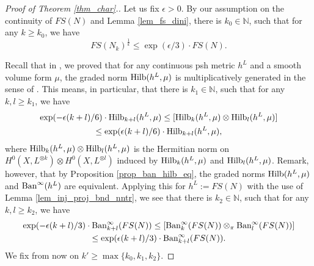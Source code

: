 \documentclass[12pt]{article}
\numberwithin{equation}{section}
\theoremstyle{theorem}
\theoremstyle{definition}
\theoremstyle{remark}
\newcommand{\nat}{\mathbb{N}}
\begin{document}
	\begin{proof}[Proof of Theorem \ref{thm_char}.]
		Let us fix $\epsilon > 0$.
		By our assumption on the continuity of $FS(N)$ and Lemma \ref{lem_fs_dini}, there is $k_0 \in \nat$, such that for any $k \geq k_0$, we have
		\begin{equation}\label{eq_fs_unif}
			FS(N_k)^{\frac{1}{k}}
			\leq
			\exp(\epsilon / 3) \cdot FS(N).
		\end{equation}
		\par 
		Recall that in \cite[Theorem 1.5]{FinSecRing}, we proved that for any continuous psh metric $h^L$ and a smooth volume form $\mu$, the graded norm ${\rm{Hilb}}(h^L, \mu)$ is multiplicatively generated in the sense of \cite[Definition 1.3]{FinSecRing}.
		This means, in particular, that there is $k_1 \in \nat$, such that for any $k, l \geq k_1$, we have
		\begin{multline}
			\exp(- \epsilon (k + l) / 6) \cdot {\rm{Hilb}}_{k + l}(h^L, \mu) \leq [{\rm{Hilb}}_k(h^L, \mu) \otimes {\rm{Hilb}}_l(h^L, \mu)] 
			\\
			\leq \exp(\epsilon (k + l) / 6) \cdot {\rm{Hilb}}_{k + l}(h^L, \mu),
		\end{multline}
		where ${\rm{Hilb}}_k(h^L, \mu) \otimes {\rm{Hilb}}_l(h^L, \mu)$ is the Hermitian norm on $H^0(X, L^{\otimes k}) \otimes H^0(X, L^{\otimes l})$ induced by ${\rm{Hilb}}_k(h^L, \mu)$ and ${\rm{Hilb}}_l(h^L, \mu)$.
		Remark, however, that by Proposition \ref{prop_ban_hilb_eq}, the graded norms ${\rm{Hilb}}(h^L, \mu)$ and ${\rm{Ban}}^{\infty}(h^L)$ are equivalent.
		Applying this for $h^L := FS(N)$ with the use of Lemma \ref{lem_inj_proj_bnd_nntr}, we see that there is $k_2 \in \nat$, such that for any $k, l \geq k_2$, we have
		\begin{multline}\label{eq_ban_inf_proj}
			\exp(- \epsilon (k + l) / 3) \cdot {\rm{Ban}}^{\infty}_{k + l}(FS(N)) \leq [{\rm{Ban}}^{\infty}_{k}(FS(N)) \otimes_{\pi} {\rm{Ban}}^{\infty}_{l}(FS(N))] 
			\\
			\leq \exp(\epsilon (k + l) / 3) \cdot {\rm{Ban}}^{\infty}_{k + l}(FS(N)).
		\end{multline}
		We fix from now on $k' \geq \max\{ k_0, k_1, k_2 \}$.

\end{proof}
\end{document}
